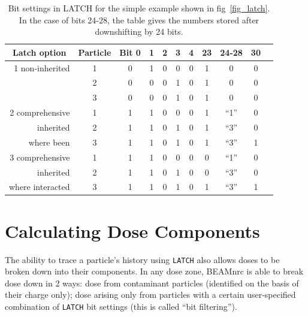 \documentclass[12pt,twoside]{article}
\begin{document}
\begin{table}[H]
\vspace*{-1cm}
\begin{center}
\caption{Bit settings in LATCH for the simple example shown in
fig~\ref{fig_latch}.  In the
case of bits 24-28, the table gives the numbers stored after downshifting by 24 bits.}
\label{table_latch}
\begin{tabular}{|r|c|ccccccc|c|c|}
\hline
\multicolumn{1}{|c}{Latch option} &
\multicolumn{1}{|c}{Particle} &
\multicolumn{1}{|c}{Bit 0} &
\multicolumn{1}{c}{1} &
\multicolumn{1}{c}{2} &
\multicolumn{1}{c}{3} &
\multicolumn{1}{c}{4} &
\multicolumn{1}{c}{23} &
\multicolumn{1}{c}{24-28} &
\multicolumn{1}{c|}{30}\\
\hline
1 non-inherited & 1 & 0 & 1 & 0 & 0 & 0 & 1 & 0 & 0\\
~~~             & 2 & 0 & 0 & 0 & 1 & 0 & 1 & 0 & 0\\
~~~~~~~         & 3 & 0 & 0 & 0 & 1 & 0 & 1 & 0 & 0\\
\hline
2 comprehensive & 1 & 1 & 1 & 0 & 0 & 0 & 1 & ``1'' & 0\\
inherited       & 2 & 1 & 1 & 0 & 1 & 0 & 1 & ``3'' & 0\\
where been      & 3 & 1 & 1 & 0 & 1 & 0 & 1 & ``3'' & 1\\
\hline
3 comprehensive & 1 & 1 & 1 & 0 & 0 & 0 & 0 & ``1'' & 0\\
inherited       & 2 & 1 & 1 & 0 & 1 & 0 & 0 & ``3'' & 0\\
where interacted & 3 & 1 & 1 & 0 & 1 & 0 & 1 & ``3'' & 1\\
\hline
\end{tabular}
\end{center}
\end{table}

\clearpage

\section{Calculating Dose Components}
\label{dosecompsect}

The ability to trace a particle's history using \verb+LATCH+ also allows doses
to be broken down into their components.  In any dose zone, BEAMnrc is able
to break dose down in 2 ways:
dose from contaminant particles (identified on
the basis of their charge only); dose
arising only from particles with a certain user-specified combination of
\verb+LATCH+ bit settings (this is called ``bit filtering'').
\end{document}
